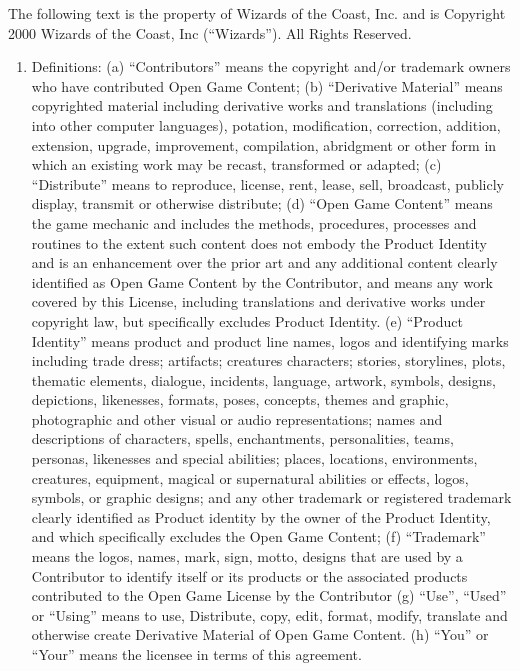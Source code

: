\documentclass{tufte-handout}
\begin{document}
\begin{fullwidth}
The following text is the property of Wizards of the Coast, Inc. and is Copyright 2000 Wizards of the Coast, Inc
(``Wizards''). All Rights Reserved.

\begin{enumerate}

\item Definitions: (a) ``Contributors'' means the copyright and/or
  trademark owners who have contributed Open Game Content; (b)
  ``Derivative Material'' means copyrighted material including
  derivative works and translations (including into other computer
  languages), potation, modification, correction, addition, extension,
  upgrade, improvement, compilation, abridgment or other form in which
  an existing work may be recast, transformed or adapted; (c)
  ``Distribute'' means to reproduce, license, rent, lease, sell,
  broadcast, publicly display, transmit or otherwise distribute; (d)
  ``Open Game Content'' means the game mechanic and includes the
  methods, procedures, processes and routines to the extent such
  content does not embody the Product Identity and is an enhancement
  over the prior art and any additional content clearly identified as
  Open Game Content by the Contributor, and means any work covered by
  this License, including translations and derivative works under
  copyright law, but specifically excludes Product Identity. (e)
  ``Product Identity'' means product and product line names, logos and
  identifying marks including trade dress; artifacts; creatures
  characters; stories, storylines, plots, thematic elements, dialogue,
  incidents, language, artwork, symbols, designs, depictions,
  likenesses, formats, poses, concepts, themes and graphic,
  photographic and other visual or audio representations; names and
  descriptions of characters, spells, enchantments, personalities,
  teams, personas, likenesses and special abilities; places,
  locations, environments, creatures, equipment, magical or
  supernatural abilities or effects, logos, symbols, or graphic
  designs; and any other trademark or registered trademark clearly
  identified as Product identity by the owner of the Product Identity,
  and which specifically excludes the Open Game Content; (f)
  ``Trademark'' means the logos, names, mark, sign, motto, designs
  that are used by a Contributor to identify itself or its products or
  the associated products contributed to the Open Game License by the
  Contributor (g) ``Use'', ``Used'' or ``Using'' means to use,
  Distribute, copy, edit, format, modify, translate and otherwise
  create Derivative Material of Open Game Content. (h) ``You'' or
  ``Your'' means the licensee in terms of this agreement.


\end{enumerate}
\end{fullwidth}
\end{document}
